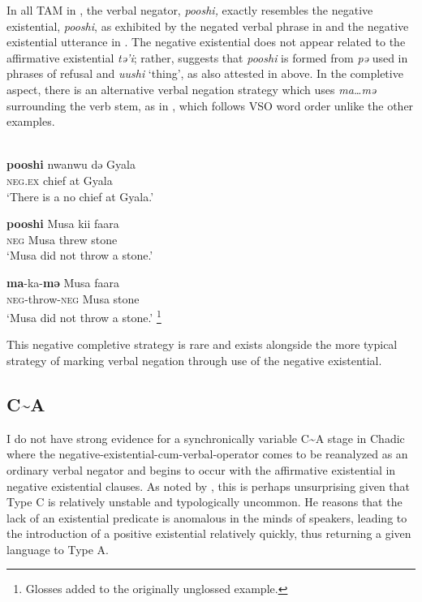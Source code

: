 \documentclass[output=paper,draft,draftmode,colorlinks,citecolor=brown]{langscibook}
\begin{document}
In all TAM in , the verbal negator, \textit{pooshi,} exactly
resembles the negative existential, \textit{pooshi}, as exhibited by the
negated verbal phrase in  and the negative existential
utterance in .  The negative existential does not appear
related to the affirmative existential \textit{tə'i}; rather,
\citet[90]{Hoskison1983} suggests that \textit{pooshi} is formed from
\textit{pə} used in phrases of refusal and \textit{uushi} `thing', as also
attested in  above. In the completive aspect, there is an
alternative verbal negation strategy which uses \textit{ma{\ldots}mə}
surrounding the verb stem, as in , which follows VSO word order unlike the other examples.

\ea\label{ex:gude-stone-chief-Musa} \\ 
\ex\label{ex:gude-chief}
\gll \textbf{pooshi} nwanwu də Gyala\\
\textsc{neg.ex} chief at Gyala\\
\glt `There is a no chief at Gyala.'

\ea\label{ex:gude-stone}
\gll \textbf{pooshi} Musa kii
faara\\ \textsc{neg} Musa threw stone\\
\glt `Musa did not throw a stone.'

\ex\label{ex:gude-Musa}

\gll \textbf{ma}-ka-\textbf{mə} Musa faara\\
\textsc{neg}-throw-\textsc{neg} Musa stone\\

\glt `Musa did not throw a stone.' \footnote{Glosses added to the originally unglossed example.}

\z
\z

This negative completive strategy is rare and exists alongside the more typical strategy of marking verbal negation through use of the negative existential. 

\subsection{C{\textasciitilde}A}\label{sec:3:3.6}

I do not have strong evidence for a synchronically variable C{\textasciitilde}A stage in Chadic where the negative-existential-cum-verbal-operator comes to be reanalyzed as an ordinary verbal negator and begins to occur with the affirmative existential in negative existential clauses. As noted by \citet[19]{Croft1991}, this is perhaps unsurprising given that Type C is relatively unstable and typologically uncommon. He reasons that the lack of an existential predicate is anomalous in the minds of speakers, leading to the introduction of a positive existential relatively quickly, thus returning a given language to Type A. 
\end{document}
